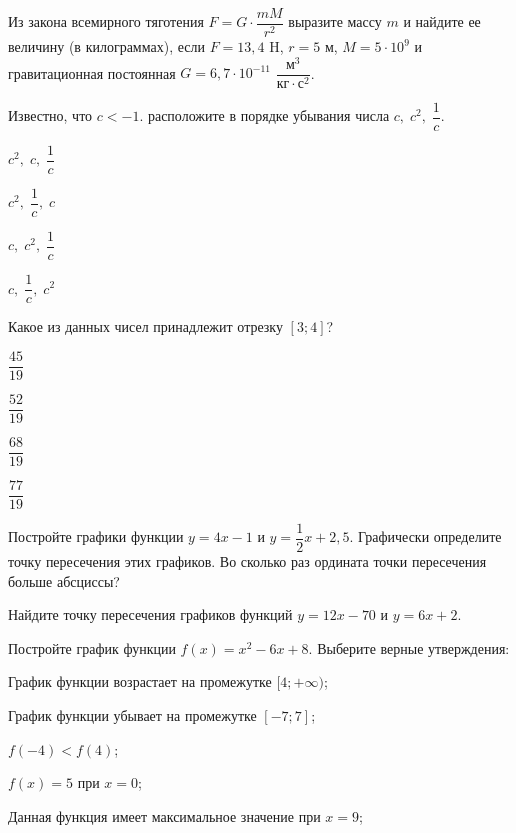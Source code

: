 %
%
\begin{class}[number=2]
	\begin{listofex}
		\item Из закона всемирного тяготения \( F=G\cdot\dfrac{mM}{r^2} \) выразите массу \( m \) и найдите ее величину (в килограммах), если \( F=13,4 \) H, \( r=5 \) м, \( M=5\cdot10^9 \) и гравитационная постоянная \( G=6,7\cdot10^{-11} \) \( \dfrac{\text{м}^3}{\text{кг}\cdot\text{с}^2} \).
		\item Известно, что \( c<-1 \). расположите в порядке убывания числа \( c,\; c^2,\; \dfrac{1}{c}\).
		\begin{enumcols}[itemcolumns=4]
			\item \( c^2,\; c,\; \dfrac{1}{c} \)
			\item \( c^2,\; \dfrac{1}{c},\; c \)
			\item \( c,\; c^2,\; \dfrac{1}{c} \)
			\item \( c,\; \dfrac{1}{c},\; c^2 \)
		\end{enumcols}
		\item Какое из данных чисел принадлежит отрезку \( [3;4] \)?
		\begin{enumcols}[itemcolumns=4]
			\item \( \dfrac{45}{19} \)
			\item \( \dfrac{52}{19} \)
			\item \( \dfrac{68}{19} \)
			\item \( \dfrac{77}{19} \)
		\end{enumcols}
		\item Постройте графики функции \( y=4x-1 \) и \( y=\dfrac{1}{2}x+2,5 \). Графически определите точку пересечения этих графиков. Во сколько раз ордината точки пересечения больше абсциссы?
		\item Найдите точку пересечения графиков функций \( y=12x-70 \) и \( y=6x+2 \).
		\item Постройте график функции \( f(x)=x^2-6x+8 \). Выберите верные утверждения:
		\begin{enumcols}[itemcolumns=1]
			\item График функции возрастает на промежутке \( [4;+\infty) \);
			\item График функции убывает на промежутке \( [-7;7] \);
			\item \( f(-4)<f(4) \);
			\item \( f(x)=5 \) при \( x=0 \);
			\item Данная функция имеет максимальное значение при \( x=9 \);

\end{enumcols}
\end{listofex}
\end{class}
